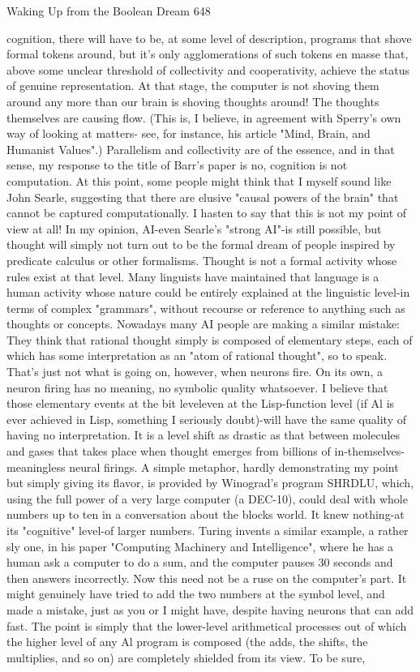 Waking Up from the Boolean Dream                                                     648

cognition, there will have to be, at some level of description, programs that shove
formal tokens around, but it's only agglomerations of such tokens en masse that,
above some unclear threshold of collectivity and cooperativity, achieve the status of
genuine representation. At that stage, the computer is not shoving them around any
more than our brain is shoving thoughts around! The thoughts themselves are causing
flow. (This is, I believe, in agreement with Sperry's own way of looking at matters-
see, for instance, his article "Mind, Brain, and Humanist Values".) Parallelism and
collectivity are of the essence, and in that sense, my response to the title of Barr's
paper is no, cognition is not computation.
        At this point, some people might think that I myself sound like John Searle,
suggesting that there are elusive "causal powers of the brain" that cannot be captured
computationally. I hasten to say that this is not my point of view at all! In my opinion,
AI-even Searle's "strong AI"-is still possible, but thought will simply not turn out to
be the formal dream of people inspired by predicate calculus or other formalisms.
Thought is not a formal activity whose rules exist at that level.
        Many linguists have maintained that language is a human activity whose
nature could be entirely explained at the linguistic level-in terms of complex
"grammars", without recourse or reference to anything such as thoughts or concepts.
Nowadays many AI people are making a similar mistake: They think that rational
thought simply is composed of elementary steps, each of which has some
interpretation as an "atom of rational thought", so to speak. That's just not what is
going on, however, when neurons fire. On its own, a neuron firing has no meaning, no
symbolic quality whatsoever. I believe that those elementary events at the bit
leveleven at the Lisp-function level (if Al is ever achieved in Lisp, something I
seriously doubt)-will have the same quality of having no interpretation. It is a level
shift as drastic as that between molecules and gases that takes place when thought
emerges from billions of in-themselves-meaningless neural firings.
        A simple metaphor, hardly demonstrating my point but simply giving its
flavor, is provided by Winograd's program SHRDLU, which, using the full power of a
very large computer (a DEC-10), could deal with whole numbers up to ten in a
conversation about the blocks world. It knew nothing-at its "cognitive" level-of larger
numbers. Turing invents a similar example, a rather sly one, in his paper "Computing
Machinery and Intelligence", where he has a human ask a computer to do a sum, and
the computer pauses 30 seconds and then answers incorrectly. Now this need not be a
ruse on the computer's part. It might genuinely have tried to add the two numbers at
the symbol level, and made a mistake, just as you or I might have, despite having
neurons that can add fast.
        The point is simply that the lower-level arithmetical processes out of which the
higher level of any Al program is composed (the adds, the shifts, the multiplies, and
so on) are completely shielded from its view. To be sure,




